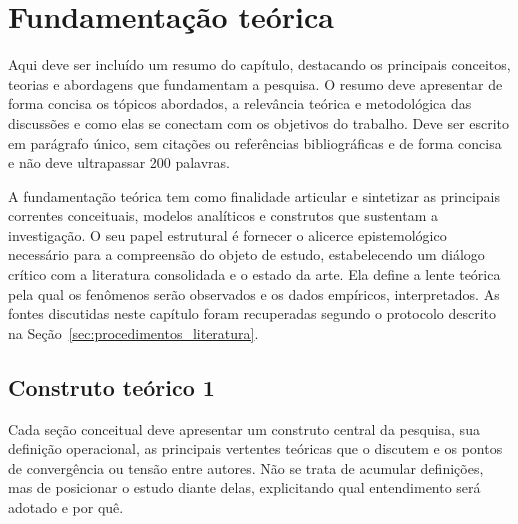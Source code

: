 %
\chapter{Fundamentação teórica}
\label{ch:fundamentacao_teorica}
\begin{resumocapitulo}
  Aqui deve ser incluído um resumo do capítulo, destacando os principais conceitos, teorias e abordagens que fundamentam a pesquisa. O resumo deve apresentar de forma concisa os tópicos abordados, a relevância teórica e metodológica das discussões e como elas se conectam com os objetivos do trabalho. Deve ser escrito em parágrafo único, sem citações ou referências bibliográficas e de forma concisa e não deve ultrapassar 200 palavras.
\end{resumocapitulo}

A fundamentação teórica tem como finalidade articular e sintetizar as principais correntes conceituais, modelos analíticos e construtos que sustentam a investigação. O seu papel estrutural é fornecer o alicerce epistemológico necessário para a compreensão do objeto de estudo, estabelecendo um diálogo crítico com a literatura consolidada e o estado da arte. Ela define a lente teórica pela qual os fenômenos serão observados e os dados empíricos, interpretados. As fontes discutidas neste capítulo foram recuperadas segundo o protocolo descrito na Seção~\ref{sec:procedimentos_literatura}.

\section{Construto teórico 1}
\label{sec:construto_1}
Cada seção conceitual deve apresentar um construto central da pesquisa, sua definição operacional, as principais vertentes teóricas que o discutem e os pontos de convergência ou tensão entre autores. Não se trata de acumular definições, mas de posicionar o estudo diante delas, explicitando qual entendimento será adotado e por quê.

